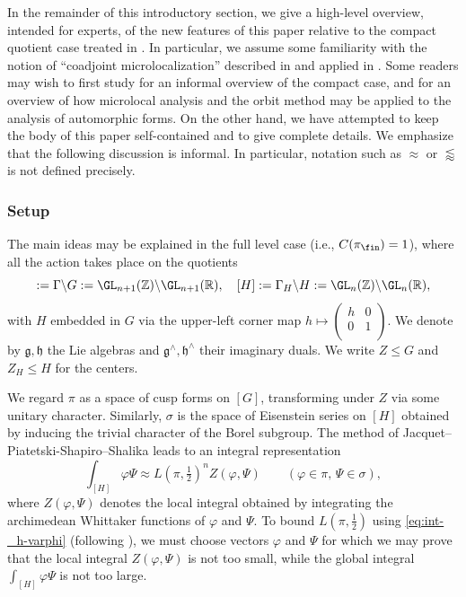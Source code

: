 In the remainder of this introductory section, we give a high-level overview, intended for experts, of the new features of this paper relative to the compact quotient case treated in \cite{2020arXiv201202187N}.  In particular, we assume some familiarity with the notion of ``coadjoint microlocalization'' described in \cite[\S1]{nelson-venkatesh-1} and applied in \cite{2020arXiv201202187N}.  Some readers may wish to first study \cite[\S2]{2020arXiv201202187N} for an informal overview of the compact case, and \cite[\S1]{nelson-venkatesh-1} for an overview of how microlocal analysis and the orbit method may be applied to the analysis of automorphic forms.  On the other hand, we have attempted to keep the body of this paper self-contained and to give complete details.  We emphasize that the following discussion is informal.  In particular, notation such as $\approx$ or $\lessapprox$ is not defined precisely.

\subsubsection{Setup}\label{sec:crb1dssqx4}
The main ideas may be explained in the full level case (i.e., $C(\pi_{\fin}) = 1$), where all the action takes place on the quotients
\begin{equation*} [G] := \Gamma \backslash G := \GL_{n+1}(\mathbb{Z}) \backslash \GL_{n+1}(\mathbb{R}), \quad [H] := \Gamma_H \backslash H := \GL_{n}(\mathbb{Z}) \backslash \GL_{n}(\mathbb{R}),
\end{equation*}
with $H$ embedded in $G$ via the upper-left corner map $h \mapsto \left(
  \begin{smallmatrix}
    h&0\\
    0     &1 \\
  \end{smallmatrix}
\right)$.  We denote by $\mathfrak{g}, \mathfrak{h}$ the Lie algebras and  $\mathfrak{g}^\wedge, \mathfrak{h}^\wedge$ their imaginary duals.  We write $Z \leq G$ and $Z_H \leq H$ for the centers.

We regard $\pi$ as a space of cusp forms on $[G]$, transforming under $Z$ via some unitary character.  Similarly, $\sigma$ is the space of Eisenstein series on $[H]$ obtained by inducing the trivial character of the Borel subgroup.  The method of Jacquet--Piatetski-Shapiro--Shalika leads to an integral representation
\begin{equation}\label{eq:int-_h-varphi}
  \int_{[H]} \varphi \Psi \approx L(\pi,\tfrac{1}{2})^{n} Z(\varphi,\Psi)
  \qquad
  (\varphi \in \pi, \, \Psi \in \sigma),
\end{equation}
where $Z(\varphi,\Psi)$ denotes the local integral obtained by integrating the archimedean Whittaker functions of $\varphi$ and $\Psi$.  To bound $L(\pi,\tfrac{1}{2})$ using \eqref{eq:int-_h-varphi} (following \cite{MR2726097, venkatesh-2005, michel-2009}), we must choose vectors $\varphi$ and $\Psi$ for which we may prove that the local integral $Z(\varphi, \Psi)$ is not too small, while the global integral $\int_{[H]} \varphi \Psi$ is not too large.

